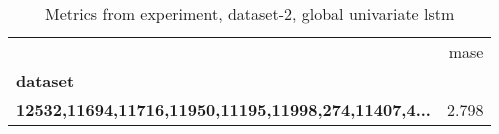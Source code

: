 \begin{table}[h]
\centering
\caption{Metrics from experiment, dataset-2, global univariate lstm}
\label{table:global-univariate-lstm-dataset-2}
\begin{tabular}{lr}
\toprule
{} &   mase \\
\textbf{dataset                                           } &        \\
\midrule
\textbf{12532,11694,11716,11950,11195,11998,274,11407,4...} &  2.798 \\
\bottomrule
\end{tabular}
\end{table}
